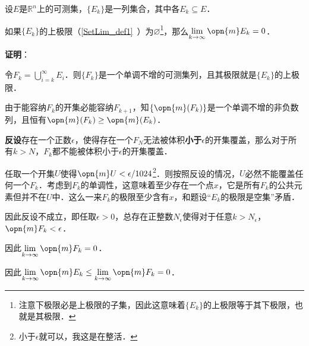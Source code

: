 



\begin{lemma}{}\label{EgrfTh_lem1}
设$E$是$\mathbb{R}^n$上的可测集，$\{E_k\}$是一列集合，其中各$E_k\subseteq E$．

如果$\{E_k\}$的上极限（\autoref{SetLim_def1}~）为$\varnothing$\footnote{注意下极限必是上极限的子集，因此这意味着$\{E_k\}$的上极限等于其下极限，也就是其极限．}，那么$\lim\limits_{k\to\infty}\opn{m}E_k=0$．
\end{lemma}

\textbf{证明}：

令$F_k=\bigcup_{i=k}^\infty E_i$．则$\{F_k\}$是一个单调不增的可测集列，且其极限就是$\{E_k\}$的上极限．

由于能容纳$F_k$的开集必能容纳$F_{k+1}$，知$\{\opn{m}(F_k)\}$是一个单调不增的非负数列，且恒有$\opn{m}(F_k)\geq\opn{m}(E_k)$．

\textbf{反设}存在一个正数$\epsilon$，使得存在一个$F_N$无法被体积\textbf{小于}$\epsilon$的开集覆盖，那么对于所有$k>N$，$F_k$都不能被体积小于$\epsilon$的开集覆盖．

任取一个开集$U$使得$\opn{m}U<\epsilon/1024$\footnote{小于$\epsilon$就可以，我这是在整活．}．则按照反设的情况，$U$必然不能覆盖任何一个$F_k$．考虑到$F_k$的单调性，这意味着至少存在一个点$x$，它是所有$F_k$的公共元素但并不在$U$中．这么一来$F_k$的极限至少含有$x$，和题设“$E_k$的极限是空集”矛盾．

因此反设不成立，即任取$\epsilon>0$，总存在正整数$N_\epsilon$使得对于任意$k>N_\epsilon$，$\opn{m}F_k<\epsilon$．

因此$\lim\limits_{k\to\infty}\opn{m}F_k=0$．

因此$\lim\limits_{k\to\infty}\opn{m}E_k\leq\lim\limits_{k\to\infty}\opn{m}F_k=0$．


